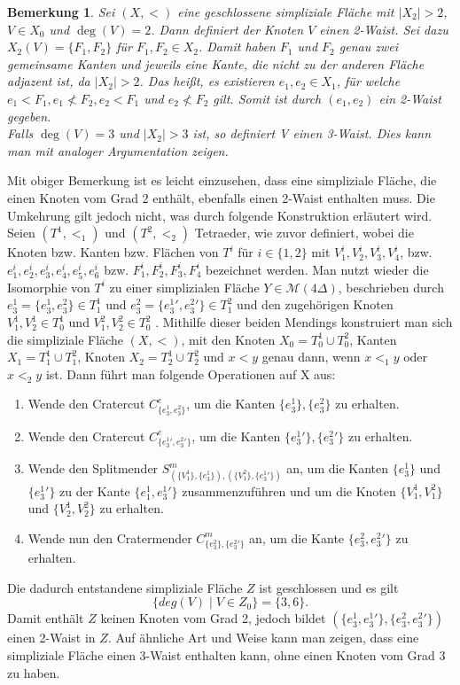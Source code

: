 \documentclass[12pt,titlepage]{article}
\newtheorem{bemerkung}{Bemerkung}[section]
\begin{document}
\begin{bemerkung}
Sei $(X,<)$ eine geschlossene simpliziale Fläche mit $\vert X_2 \vert > 2$, $V \in X_0$ und $\deg(V)=2$. Dann definiert der Knoten $V$ einen 2-Waist. Sei dazu $X_2(V)=\{F_1,F_2\}$ für $F_1,F_2 \in X_2$. Damit haben $F_1$ und $F_2$ genau zwei gemeinsame Kanten und jeweils eine Kante, die nicht zu der anderen Fläche adjazent ist, da $\vert X_2 \vert > 2$. Das heißt, es existieren $e_1,e_2\in X_1$, für welche $e_1<F_1,e_1 \nless F_2, e_2<F_1$ und $e_2  \nless F_2$ gilt. Somit ist durch $(e_1,e_2)$ ein 2-Waist gegeben.\\
Falls $\deg(V)=3$ und $\vert X_2 \vert>3$ ist, so definiert V einen 3-Waist. Dies kann man mit analoger Argumentation zeigen.
\end{bemerkung}
Mit obiger Bemerkung ist es leicht einzusehen, dass eine simpliziale Fläche, die einen Knoten vom Grad 2 enthält, ebenfalls einen 2-Waist enthalten muss. Die Umkehrung gilt jedoch nicht, was durch folgende Konstruktion erläutert wird.\\
 Seien $(T^1,<_1)$ und $(T^2,<_2)$ Tetraeder, wie zuvor definiert, wobei die Knoten bzw. Kanten bzw. Flächen von $T^i$ für $i\in \{1,2\}$ mit $V_1^i,V_2^i,V_3^i,V_4^i$, bzw. $e_1^i,e_2^i,e_3^i,e_4^i,e_5^i,e_6^i$ bzw. $F_1^i,F_2^i,F_3^i,F_4^i$ bezeichnet werden. Man nutzt wieder die Isomorphie von  $T^i$ zu einer simplizialen Fläche $Y\in \mathcal{M}(4 \Delta)$, beschrieben durch $e_3^1 =\{e_3^1,e_3^2\}\in T^1_1 $ und $e_3^2=\{{e_3^1}',{e_3^2}'\}\in T^2_1$ 
   und den zugehörigen Knoten $V_1^1,V_2^1 \in T^1_0$ und $V_1^2,V_2^2 \in T^2_0$  . Mithilfe dieser beiden Mendings konstruiert man sich die simpliziale Fläche $(X,<)$, mit den Knoten $X_0=T^1_0 \cup T^2_0$, Kanten $X_1=T^1_1 \cup T^2_1$, Knoten $X_2=T^1_2 \cup T^2_2$ und $x<y$ genau dann, wenn $x<_1y$ oder $x<_2 y$ ist. Dann führt man folgende Operationen auf X aus:
 \begin{enumerate}
 \item Wende den Cratercut $C^c_{\{e_{3}^1,e_{3}^2\}}$, um die Kanten $\{e_3^1\},\{e_3^2\}$ zu erhalten.
 \item Wende den Cratercut $C^c_{\{{e_{3}^1}',{e_{3}^2}'\}}$, um die Kanten $\{{e_3^1}'\},\{{e_3^2}'\}$ zu erhalten.
\item Wende den Splitmender $S^m_{(\{V_1^1\},\{e_3^1\}),(\{V_1^2\},\{{e_3^1}'\})}$ an, um die Kanten $\{e_3^1\}$ und $\{{e_3^1}'\}$ zu der Kante $\{e_1^1,{e_3^1}'\}$ zusammenzuführen und um die Knoten $\{V_1^1,V_1^2\}$ und $\{V_2^1,V_2^2\}$ zu erhalten.
 \item Wende nun den Cratermender $C^m_{\{e_3^2\},\{{e_3^2}'\}}$ an, um die Kante $\{e_3^2,{e_3^2}'\}$ zu erhalten.
 \end{enumerate}
 Die dadurch entstandene simpliziale Fläche $Z$ ist geschlossen und es gilt
 \[
 \{deg(V)\mid V\in Z_0\}=\{3,6\}.
 \] 
 Damit enthält $Z$ keinen Knoten vom Grad 2, jedoch bildet $(\{e_{3}^1,{e_{3}^1}'\},\{e_{3}^2,{e_{3}^2}'\})$ einen 2-Waist in $Z$. Auf ähnliche Art und Weise kann man zeigen, dass eine simpliziale Fläche einen 3-Waist enthalten kann, ohne einen Knoten vom Grad 3 zu haben.\\
\end{document}
